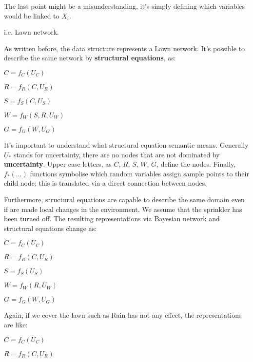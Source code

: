 The last point might be a misunderstanding, it's simply defining which variables would be linked to $X_i$.
\begin{example}
    i.e. Lawn network.
    \begin{center}
    \end{center}
    As written before, the data structure represents a Lawn network. It's possible to describe the same network by \textbf{structural equations}, as: \vspace{3.5pt}

    $C = f_C(U_C)$

    $R = f_R(C, U_R)$

    $S = f_S(C, U_S)$

    $W = f_W(S, R, U_W)$

    $G = f_G(W, U_G)$ \vspace{3.5pt}

    It's important to understand what structural equation semantic means. Generally $U_*$ stands for uncertainty, there are no nodes that are not dominated by \textbf{uncertainty}.
    Upper case letters, as $C$, $R$, $S$, $W$, $G$, define the nodes. Finally, $f_*(\dots)$ functions symbolise which random variables assign sample points to their child node; this is translated via a direct connection between nodes. \vspace{3.5pt}

    Furthermore, structural equations are capable to describe the same domain even if are made local changes in the environment. We assume that the sprinkler has been turned off. 
    The resulting representations via Bayesian network and structural equations change as:
    \begin{center}
    \end{center}
    $C = f_C(U_C)$

    $R = f_R(C, U_R)$

    $S = f_S(U_S)$

    $W = f_W(R, U_W)$

    $G = f_G(W, U_G)$ \vspace{3.5pt}

    Again, if we cover the lawn such as Rain has not any effect, the representations are like:
        \begin{center}
    \end{center}
    $C = f_C(U_C)$

    $R = f_R(C, U_R)$


\end{example}
